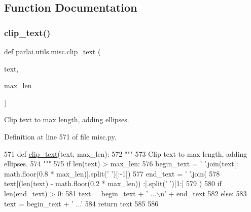 \subsection{Function Documentation}
\mbox{\label{namespaceparlai_1_1utils_1_1misc_a219b248f4399036a381ca859aa97433e}} 
\subsubsection{\texorpdfstring{clip\+\_\+text()}{clip\_text()}}
{\footnotesize\ttfamily def parlai.\+utils.\+misc.\+clip\+\_\+text (\begin{DoxyParamCaption}\item[{}]{text,  }\item[{}]{max\+\_\+len }\end{DoxyParamCaption})}

\begin{DoxyVerb}Clip text to max length, adding ellipses.
\end{DoxyVerb}
 

Definition at line 571 of file misc.\+py.


\begin{DoxyCode}
571 \textcolor{keyword}{def }\hyperlink{namespaceparlai_1_1utils_1_1misc_a219b248f4399036a381ca859aa97433e}{clip\_text}(text, max\_len):
572     \textcolor{stringliteral}{"""}
573 \textcolor{stringliteral}{    Clip text to max length, adding ellipses.}
574 \textcolor{stringliteral}{    """}
575     \textcolor{keywordflow}{if} len(text) > max\_len:
576         begin\_text = \textcolor{stringliteral}{' '}.join(text[: math.floor(0.8 * max\_len)].split(\textcolor{stringliteral}{' '})[:-1])
577         end\_text = \textcolor{stringliteral}{' '}.join(
578             text[(len(text) - math.floor(0.2 * max\_len)) :].split(\textcolor{stringliteral}{' '})[1:]
579         )
580         \textcolor{keywordflow}{if} len(end\_text) > 0:
581             text = begin\_text + \textcolor{stringliteral}{' ...\(\backslash\)n'} + end\_text
582         \textcolor{keywordflow}{else}:
583             text = begin\_text + \textcolor{stringliteral}{' ...'}
584     \textcolor{keywordflow}{return} text
585 
586 
\end{DoxyCode}
\mbox{\label{namespaceparlai_1_1utils_1_1misc_a7c86f996f4b55a960da46c1142a2c507}} 
